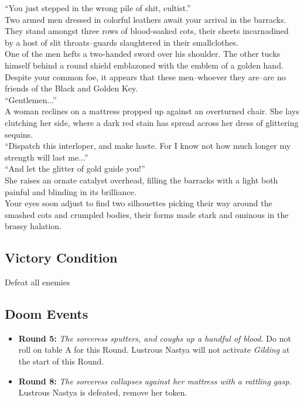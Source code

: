 “You just stepped in the wrong pile of shit, cultist.”\\

Two armed men dressed in colorful leathers await your arrival in the barracks. They stand amongst three rows of blood-soaked cots, their sheets incarnadined by a host of slit throats--guards slaughtered in their smallclothes.\\

One of the men hefts a two-handed sword over his shoulder. The other tucks himself behind a round shield emblazoned with the emblem of a golden hand. Despite your common foe, it appears that these men--whoever they are--are no friends of the Black and Golden Key.\\

“Gentlemen...”\\

A woman reclines on a mattress propped up against an overturned chair. She lays clutching her side, where a dark red stain has spread across her dress of glittering sequins.\\

“Dispatch this interloper, and make haste. For I know not how much longer my strength will last me...”\\

“And let the glitter of gold guide you!”\\
She raises an ornate catalyst overhead, filling the barracks with a light both painful and blinding in its brilliance.\\

Your eyes soon adjust to find two silhouettes picking their way around the smashed cots and crumpled bodies, their forms made stark and ominous in the brassy halation.\\

\subsection*{Victory Condition}
Defeat all enemies

\subsection*{Doom Events}
\begin{itemize}
\item \textbf{Round 5:} \emph{The sorceress sputters, and coughs up a handful of blood.} Do not roll on table A for this Round. Lustrous Nastya will not activate \emph{Gilding} at the start of this Round.
\item \textbf{Round 8:} \emph{The sorceress collapses against her mattress with a rattling gasp.} Lustrous Nastya is defeated, remove her token.
\end{itemize}

